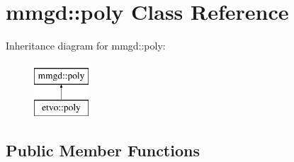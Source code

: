 \section{mmgd\+:\+:poly Class Reference}
\label{classmmgd_1_1poly}
Inheritance diagram for mmgd\+:\+:poly\+:\begin{figure}[H]
\begin{center}
\leavevmode
\includegraphics[height=2.000000cm]{classmmgd_1_1poly}
\end{center}
\end{figure}
\subsection*{Public Member Functions}
